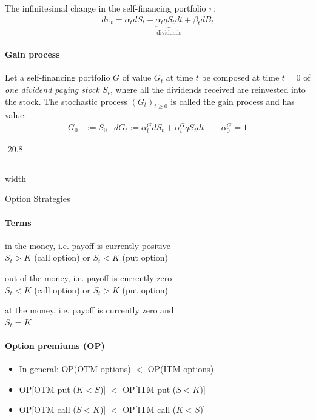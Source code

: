 \documentclass[a4paper,landscape,7pt,fleqn]{scrartcl}
\makeatletter
\renewcommand{\subsubsection}{\@startsection{subsubsection}{1}{0mm}%
{-2\baselineskip}{0.8\baselineskip}%
{\hrule depth 0.2pt width\columnwidth\vspace*{1.2em}\normalsize\bfseries}}
\makeatother
\begin{document}
\begin{multicols*}{3}
The infinitesimal change in the self-financing portfolio $\pi$:
\begin{align*}
d\pi_t = \alpha_t dS_t + \underbrace{\alpha_t q S_t dt}_\text{dividends} + \beta_t dB_t
\end{align*}

\paragraph{Gain process}
Let a self-financing portfolio $G$ of value $G_t$ at time $t$ be composed at time $t=0$ of \textit{one dividend paying stock $S_t$}, where all the dividends received are reinvested into the stock. The stochastic process $(G_t)_{t \geq 0}$ is called the gain process and has value:
\begin{align*}
G_0 &:= S_0 & dG_t := \alpha_t^G dS_t + \alpha_t^G q S_t dt \qquad \alpha_0^G = 1
\end{align*}

\subsubsection{Option Strategies}

\paragraph{Terms}
\begin{description}[style=multiline,leftmargin=1cm,font=\normalfont]
\item[ITM] in the money, i.e. payoff is currently positive \\
$S_t > K$ (call option) or $S_t < K$ (put option)
\item[OTM] out of the money, i.e. payoff is currently zero \\
$S_t < K$ (call option) or $S_t > K$ (put option)
\item[ATM] at the money, i.e. payoff is currently zero and \\
$S_t = K$
\end{description}

\paragraph{Option premiums (OP)}
\begin{itemize}
\item In general: OP(OTM options) $<$ OP(ITM options)
\item OP[OTM put ($K<S$)] $<$ OP[ITM put ($S<K$)]
\item OP[OTM call ($S<K$)] $<$ OP[ITM call ($K<S$)]
\end{itemize}


\end{multicols*}
\end{document}
